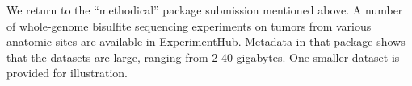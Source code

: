 \documentclass[graybox]{svmult}
\begin{document}
We return to the ``methodical'' package
submission mentioned above.
A number of whole-genome bisulfite sequencing experiments on
tumors from various anatomic sites are available
in ExperimentHub.
Metadata in that package shows that the datasets
are large, ranging from 2-40 gigabytes. One smaller
dataset is provided for illustration.

\end{document}
